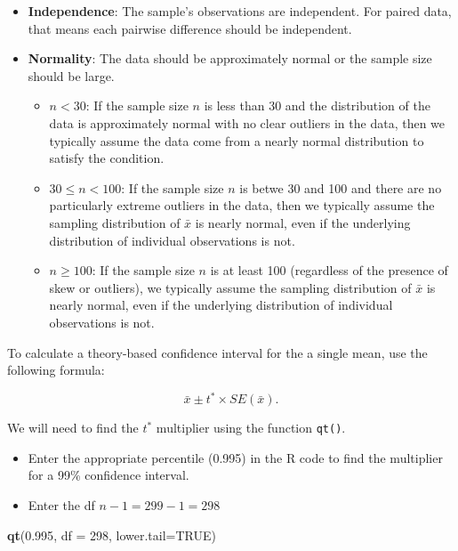 \documentclass[
]{report}
\newenvironment{Shaded}{\begin{snugshade}}{\end{snugshade}}
\newcommand{\AttributeTok}[1]{\textcolor[rgb]{0.13,0.29,0.53}{#1}}
\newcommand{\ConstantTok}[1]{\textcolor[rgb]{0.56,0.35,0.01}{#1}}
\newcommand{\DecValTok}[1]{\textcolor[rgb]{0.00,0.00,0.81}{#1}}
\newcommand{\FloatTok}[1]{\textcolor[rgb]{0.00,0.00,0.81}{#1}}
\newcommand{\FunctionTok}[1]{\textcolor[rgb]{0.13,0.29,0.53}{\textbf{#1}}}
\newcommand{\NormalTok}[1]{#1}
\begin{document}
\begin{itemize}
\item
  \textbf{Independence}: The sample's observations are independent. For paired data, that means each pairwise difference should be independent.
\item
  \textbf{Normality}: The data should be approximately normal or the sample size should be large.

  \begin{itemize}
  \item
    \(n < 30\): If the sample size \(n\) is less than 30 and the distribution of the data is approximately normal with no clear outliers in the data, then we typically assume the data come from a nearly normal distribution to satisfy the condition.
  \item
    \(30 \leq n < 100\): If the sample size \(n\) is betwe 30 and 100 and there are no particularly extreme outliers in the data, then we typically assume the sampling distribution of \(\bar{x}\) is nearly normal, even if the underlying distribution of individual observations is not.
  \item
    \(n \geq 100\): If the sample size \(n\) is at least 100 (regardless of the presence of skew or outliers), we typically assume the sampling distribution of \(\bar{x}\) is nearly normal, even if the underlying distribution of individual observations is not.
  \end{itemize}
\end{itemize}

\newpage

To calculate a theory-based confidence interval for the a single mean, use the following formula:

\[\bar{x}\pm t^* \times SE(\bar{x}).\]

We will need to find the \(t^*\) multiplier using the function \texttt{qt()}.

\begin{itemize}
\item
  Enter the appropriate percentile (0.995) in the R code to find the multiplier for a 99\% confidence interval.
\item
  Enter the df \(n - 1 = 299 - 1 = 298\)
\end{itemize}

\begin{Shaded}
\begin{Highlighting}[]
\FunctionTok{qt}\NormalTok{(}\FloatTok{0.995}\NormalTok{, }\AttributeTok{df =} \DecValTok{298}\NormalTok{, }\AttributeTok{lower.tail=}\ConstantTok{TRUE}\NormalTok{)}
\end{Highlighting}
\end{Shaded}
\end{document}
